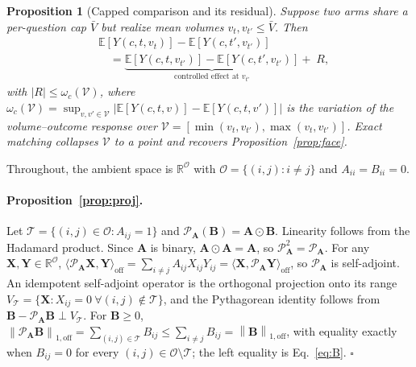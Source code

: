 \documentclass[11pt]{article}
\newcommand{\onenormoff}[1]{\left\lVert #1 \right\rVert_{1,\mathrm{off}}}
\newtheorem{proposition}{Proposition}
\begin{document}
\begin{proposition}[Capped comparison and its residual]
\label{prop:cap}
Suppose two arms share a per-question cap $\bar V$ but realize mean volumes
$v_t,v_{t'}\le\bar V$. Then
\begin{align*}
&\mathbb E[Y(c,t,v_t)]-\mathbb E[Y(c,t',v_{t'})]\\
&\quad=\underbrace{\mathbb E[Y(c,t,v_{t'})]-\mathbb E[Y(c,t',v_{t'})]}
        _{\text{controlled effect at }v_{t'}}+\;R,
\end{align*}
with $|R|\le\omega_c(\mathcal V)$, where
$\omega_c(\mathcal V)=\sup_{v,v'\in\mathcal V}\lvert\mathbb E[Y(c,t,v)]-\mathbb
E[Y(c,t,v')]\rvert$ is the variation of the volume--outcome response over
$\mathcal V=[\min(v_t,v_{t'}),\max(v_t,v_{t'})]$. Exact matching collapses
$\mathcal V$ to a point and recovers Proposition~\ref{prop:face}.
\end{proposition}


Throughout, the ambient space is $\mathbb{R}^{\mathcal{O}}$ with
$\mathcal{O}=\{(i,j):i\neq j\}$ and $A_{ii}=B_{ii}=0$.

\paragraph{Proposition~\ref{prop:proj}.}
Let $\mathcal{T}=\{(i,j)\in\mathcal{O}:A_{ij}=1\}$ and
$\mathcal{P}_{\mathbf A}(\mathbf B)=\mathbf A\odot\mathbf B$. Linearity follows
from the Hadamard product. Since $\mathbf{A}$ is binary,
$\mathbf{A}\odot\mathbf{A}=\mathbf{A}$, so
$\mathcal{P}_{\mathbf{A}}^2=\mathcal{P}_{\mathbf{A}}$. For any
$\mathbf{X},\mathbf{Y}\in\mathbb{R}^{\mathcal{O}}$,
$\langle\mathcal{P}_{\mathbf{A}}\mathbf{X},\mathbf{Y}\rangle_{\mathrm{off}}
=\sum_{i\neq j}A_{ij}X_{ij}Y_{ij}
=\langle\mathbf{X},\mathcal{P}_{\mathbf{A}}\mathbf{Y}\rangle_{\mathrm{off}}$, so
$\mathcal{P}_{\mathbf{A}}$ is self-adjoint. An idempotent self-adjoint operator
is the orthogonal projection onto its range
$V_{\mathcal T}=\{\mathbf X:X_{ij}=0\ \forall(i,j)\notin\mathcal T\}$, and the
Pythagorean identity follows from
$\mathbf{B}-\mathcal{P}_{\mathbf{A}}\mathbf{B}\perp V_{\mathcal{T}}$. For
$\mathbf{B}\ge0$,
$\onenormoff{\mathcal{P}_{\mathbf{A}}\mathbf{B}}=\sum_{(i,j)\in\mathcal{T}}B_{ij}
\le\sum_{i\neq j}B_{ij}=\onenormoff{\mathbf{B}}$, with equality exactly when
$B_{ij}=0$ for every $(i,j)\in\mathcal{O}\setminus\mathcal{T}$; the left
equality is Eq.~\ref{eq:B}. $\square$
\end{document}
